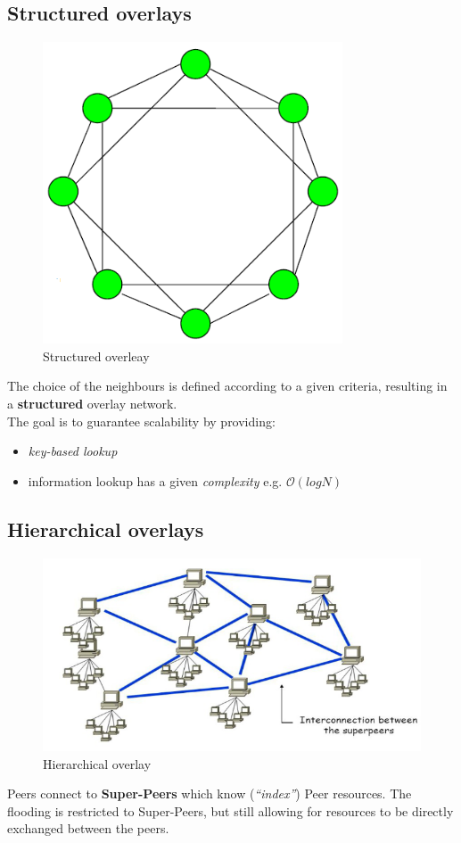 \subsection{Structured overlays}
\begin{figure}[htbp]
   \centering
   \includegraphics{images/structured_overleay.png}
   \caption{Structured overleay}
   \label{fig:structured_overleay}
\end{figure}
The choice of the neighbours is defined according to a given criteria, resulting in a \textbf{structured} overlay network.\\
The goal is to guarantee scalability by providing:
\begin{itemize}
   \item \textit{key-based lookup}
   \item  information lookup has a given \textit{complexity} e.g. $\mathcal{O}(log N)$
\end{itemize}

\subsection{Hierarchical overlays}
\begin{figure}[htbp]
   \centering
   \includegraphics{images/hierarchical_overlay.png}
   \caption{Hierarchical overlay}
   \label{fig:hierarchical_overlay}
\end{figure}
Peers connect to \textbf{Super-Peers} which know (\textit{``index''}) Peer resources.
The flooding is restricted to Super-Peers, but still allowing for resources to be directly exchanged between the peers.

